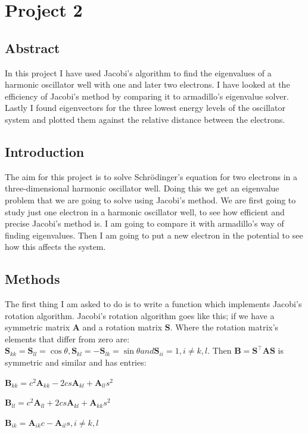 \documentclass[a4wide,12pt]{article}
\begin{document}
\section*{Project 2}

\subsection*{Abstract}
In this project I have used Jacobi's algorithm to find the eigenvalues of a harmonic oscillator well with one and later two electrons.
I have looked at the efficiency of Jacobi's method by comparing it to armadillo's eigenvalue solver.
Lastly I found eigenvectors for the three lowest energy levels of the oscillator system and plotted them against the relative distance between the electrons. 

\subsection*{Introduction}
The aim for this project is to solve Schr\"odinger's equation for two electrons in a three-dimensional harmonic oscillator well. 
Doing this we get an eigenvalue problem that we are going to solve using Jacobi's method. We are first going to study just one electron in a harmonic oscillator well, to see how efficient and precise Jacobi's method is. 
I am going to compare it with armadillo's way of finding eigenvalues. Then I am going to put a new electron in the potential to see how this affects the system.

\subsection*{Methods}
The first thing I am asked to do is to write a function which implements Jacobi's rotation algorithm. 
Jacobi's rotation algorithm goes like this; if we have a symmetric matrix $\textbf{A}$ and a rotation matrix $\textbf{S}$.
Where the rotation matrix's elements that differ from zero are: $\textbf{S}_{kk} = \textbf{S}_{ll} = \cos\theta, \textbf{S}_{kl} = -\textbf{S}_{lk} = \sin\theta and \textbf{S}_{ii} = 1, i \neq k, l$.
Then $\textbf{B} = \textbf{S}^\intercal \textbf{A} \textbf{S}$ is symmetric and similar and has entries:

$\textbf{B}_{kk} = c^2\textbf{A}_{kk}-2cs\textbf{A}_{kl}+\textbf{A}_{ll}s^2$

$\textbf{B}_{ll} = c^2\textbf{A}_{ll}+2cs\textbf{A}_{kl}+\textbf{A}_{kk}s^2$

$\textbf{B}_{ik} = \textbf{A}_{ik}c - \textbf{A}_{il}s, i \neq k,l$
\end{document}
